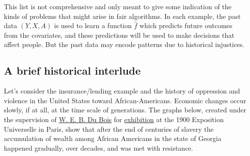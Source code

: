\documentclass[]{book}
\theoremstyle{definition}
\theoremstyle{definition}
\theoremstyle{definition}
\theoremstyle{remark}
\begin{document}
This list is not comprehensive and only meant to give some indication of
the kinds of problems that might arise in fair algorithms. In each
example, the past data \((Y, X, A)\) is used to learn a function
\(\hat f\) which predicts future outcomes from the covariates, and these
predictions will be used to make decisions that affect people. But the
past data may encode patterns due to historical injustices.

\subsection{A brief historical
interlude}\label{a-brief-historical-interlude}

Let's consider the insurance/lending example and the history of
oppression and violence in the United States toward African-Americans.
Economic changes occur slowly, if at all, at the time scale of
generations. The graphs below, created under the supervision of
\href{https://en.wikipedia.org/wiki/W._E._B._Du_Bois}{W. E. B. Du Bois}
for
\href{https://www.smithsonianmag.com/history/first-time-together-and-color-book-displays-web-du-bois-visionary-infographics-180970826/}{exhibition}
at the 1900 Exposition Universelle in Paris, show that after the end of
centuries of slavery the accumulation of wealth among African Americans
in the state of Georgia happened gradually, over decades, and was met
with resistance.
\end{document}
